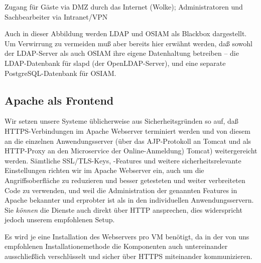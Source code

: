 \begin{minipage}{\textwidth}

{\footnotesize Zugang für Gäste via DMZ durch das Internet (Wolke);
 Administratoren und Sachbearbeiter via Intranet/VPN}

\end{minipage}

Auch in dieser Abbildung werden LDAP und OSIAM als Blackbox
dargestellt. Um Verwirrung zu vermeiden muß aber bereits hier
erwähnt werden, daß sowohl der LDAP-Server als auch OSIAM ihre
eigene Datenhaltung betreiben – die LDAP-Datenbank für slapd
(der OpenLDAP-Server), und eine separate PostgreSQL-Datenbank
für OSIAM.

\fi%

\subsection{Apache als Frontend}\label{subsec:intro-apache}

Wir setzen unsere Systeme üblicherweise aus Sicherheitsgründen so auf,
daß HTTPS-Verbindungen im Apache Webserver terminiert werden und von
diesem an die einzelnen Anwendungsserver (über das AJP-Protokoll an
\ifoa
Tomcat und als HTTP-Proxy an den Microservice der Online-Anmeldung)
\else%
Tomcat)
\fi%
weitergereicht werden. Sämtliche SSL/TLS-Keys, -Features und weitere
sicherheitsrelevante Einstellungen richten wir im Apache Webserver ein,
auch um die Angriffsoberfläche zu reduzieren und besser getesteten und
weiter verbreiteten Code zu verwenden, und weil die Administration der
genannten Features in Apache bekannter und erprobter ist als in den
individuellen Anwendungsservern. Sie \emph{können} die Dienste auch direkt
über HTTP ansprechen, dies widerspricht jedoch unserem empfohlenen Setup.

\ifoa
Es wird je eine Installation des Webservers pro VM benötigt, da in
der von uns empfohlenen Installationemethode die Komponenten auch
untereinander ausschließlich verschlüsselt und sicher über HTTPS
miteinander kommunizieren.
\fi%

